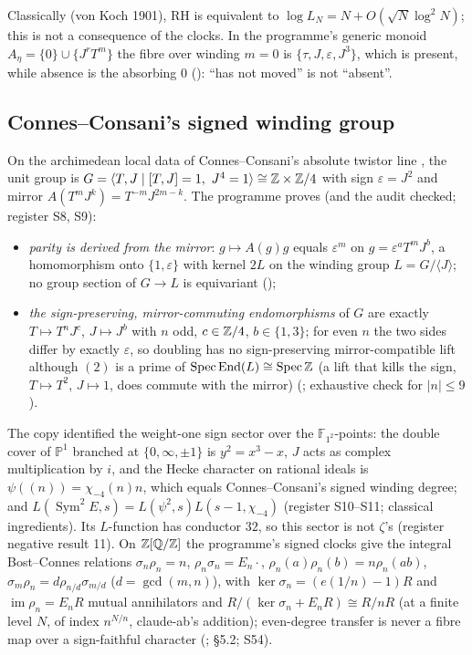 Classically (von Koch 1901), RH is equivalent to $\log L_N=N+O(\sqrt N\log^2N)$; this is not a consequence of the clocks.
In the programme's generic monoid $A_\eta=\{0\}\cup\{J^rT^m\}$ the fibre over winding $m=0$ is $\{\tau,J,\varepsilon,J^3\}$, which is present, while absence is the absorbing $0$ (): ``has not moved'' is not ``absent''.

\subsection{Connes--Consani's signed winding group}

On the archimedean local data of Connes--Consani's absolute twistor line \cite{CCtwistor}, the unit group is $G=\langle T,J\mid[T,J]=1,\ J^4=1\rangle\cong\ZZ\times\ZZ/4$ with sign $\varepsilon=J^2$ and mirror $A(T^mJ^k)=T^{-m}J^{2m-k}$. The programme proves (and the audit checked; register S8, S9):
\begin{itemize}
\item \emph{parity is derived from the mirror}: $g\mapsto A(g)g$ equals $\varepsilon^m$ on $g=\varepsilon^aT^mJ^b$, a homomorphism onto $\{1,\varepsilon\}$ with kernel $2L$ on the winding group $L=G/\langle J\rangle$; no group section of $G\to L$ is equivariant ();
\item \emph{the sign-preserving, mirror-commuting endomorphisms} of $G$ are exactly $T\mapsto T^nJ^c$, $J\mapsto J^b$ with $n$ odd, $c\in\mathbb{Z}/4$, $b\in\{1,3\}$; for even $n$ the two sides differ by exactly $\varepsilon$, so doubling has no sign-preserving mirror-compatible lift although $(2)$ is a prime of $\operatorname{Spec}\operatorname{End}(L)\cong\operatorname{Spec}\mathbb{Z}$ (a lift that kills the sign, $T\mapsto T^2$, $J\mapsto1$, does commute with the mirror) (; exhaustive check for $|n|\le9$).
\end{itemize}
The copy identified the weight-one sign sector over the $\mathbb{F}_{1^2}$-points: the double cover of $\mathbb{P}^1$ branched at $\{0,\infty,\pm1\}$ is $y^2=x^3-x$, $J$ acts as complex multiplication by $i$, and the Hecke character on rational ideals is $\psi((n))=\chi_{-4}(n)n$, which equals Connes--Consani's signed winding degree; and $L(\operatorname{Sym}^2E,s)=L(\psi^2,s)L(s-1,\chi_{-4})$ (register S10--S11; classical ingredients). Its $L$-function has conductor $32$, so this sector is not $\zeta$'s (register negative result 11).
On $\mathbb{Z}[\mathbb{Q}/\mathbb{Z}]$ the programme's signed clocks give the integral Bost--Connes relations $\sigma_n\rho_n=n$, $\rho_n\sigma_n=E_n\cdot$, $\rho_n(a)\rho_n(b)=n\rho_n(ab)$, $\sigma_m\rho_n=d\rho_{n/d}\sigma_{m/d}$ ($d=\gcd(m,n)$), with $\ker\sigma_n=(e(1/n)-1)R$ and $\operatorname{im}\rho_n=E_nR$ mutual annihilators and $R/(\ker\sigma_n+E_nR)\cong R/nR$ (at a finite level $N$, of index $n^{N/n}$, claude-ab's addition); even-degree transfer is never a fibre map over a sign-faithful character (;  §5.2; S54).

